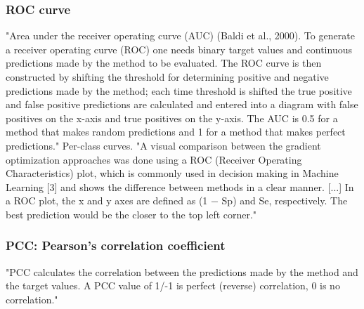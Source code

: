 \documentclass[]{scrartcl}
\begin{document}
\subsubsection{ROC curve}
"Area under the receiver operating curve (AUC) (Baldi et al., 2000). To generate a receiver operating curve (ROC) one needs binary target values and continuous predictions made by the method to be evaluated. The ROC curve is then constructed by shifting the threshold for determining positive and negative predictions made by the method; each time threshold is shifted the true positive and false positive predictions are calculated and entered into a diagram with false positives on the x-axis and true positives on the y-axis. The AUC is 0.5 for a method that makes random predictions and 1 for a method that makes perfect predictions." \cite{Jurtz2017}
Per-class curves.
"A visual comparison between the gradient optimization approaches was done using a ROC (Receiver Operating Characteristics) plot, which is commonly used in decision making in Machine Learning [3] and shows the difference between methods in a clear manner. [...] In a ROC plot, the x and y axes are defined as (1 − Sp) and Se, respectively. The best prediction would be the closer to the top left corner." \cite{Hattori2017}
\subsubsection{PCC: Pearson's correlation coefficient}
"PCC calculates the correlation between the predictions made by the method and the target values. A PCC value of 1/-1 is perfect (reverse) correlation, 0 is no correlation." \cite{Jurtz2017}
\end{document}
